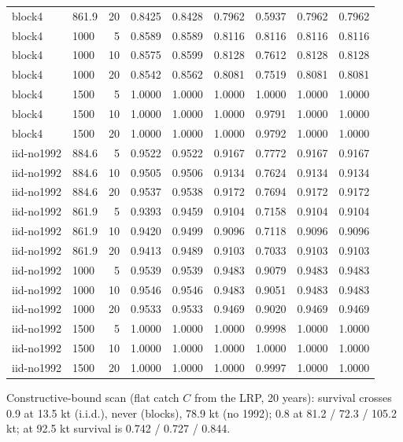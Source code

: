 \begin{longtable}{llrrrrrrr}
block4 & 861.9 & 20 & 0.8425 & 0.8428 & 0.7962 & 0.5937 & 0.7962 & 0.7962 \\
block4 & 1000 & 5 & 0.8589 & 0.8589 & 0.8116 & 0.8116 & 0.8116 & 0.8116 \\
block4 & 1000 & 10 & 0.8575 & 0.8599 & 0.8128 & 0.7612 & 0.8128 & 0.8128 \\
block4 & 1000 & 20 & 0.8542 & 0.8562 & 0.8081 & 0.7519 & 0.8081 & 0.8081 \\
block4 & 1500 & 5 & 1.0000 & 1.0000 & 1.0000 & 1.0000 & 1.0000 & 1.0000 \\
block4 & 1500 & 10 & 1.0000 & 1.0000 & 1.0000 & 0.9791 & 1.0000 & 1.0000 \\
block4 & 1500 & 20 & 1.0000 & 1.0000 & 1.0000 & 0.9792 & 1.0000 & 1.0000 \\
iid-no1992 & 884.6 & 5 & 0.9522 & 0.9522 & 0.9167 & 0.7772 & 0.9167 & 0.9167 \\
iid-no1992 & 884.6 & 10 & 0.9505 & 0.9506 & 0.9134 & 0.7624 & 0.9134 & 0.9134 \\
iid-no1992 & 884.6 & 20 & 0.9537 & 0.9538 & 0.9172 & 0.7694 & 0.9172 & 0.9172 \\
iid-no1992 & 861.9 & 5 & 0.9393 & 0.9459 & 0.9104 & 0.7158 & 0.9104 & 0.9104 \\
iid-no1992 & 861.9 & 10 & 0.9420 & 0.9499 & 0.9096 & 0.7118 & 0.9096 & 0.9096 \\
iid-no1992 & 861.9 & 20 & 0.9413 & 0.9489 & 0.9103 & 0.7033 & 0.9103 & 0.9103 \\
iid-no1992 & 1000 & 5 & 0.9539 & 0.9539 & 0.9483 & 0.9079 & 0.9483 & 0.9483 \\
iid-no1992 & 1000 & 10 & 0.9546 & 0.9546 & 0.9483 & 0.9051 & 0.9483 & 0.9483 \\
iid-no1992 & 1000 & 20 & 0.9533 & 0.9533 & 0.9469 & 0.9020 & 0.9469 & 0.9469 \\
iid-no1992 & 1500 & 5 & 1.0000 & 1.0000 & 1.0000 & 0.9998 & 1.0000 & 1.0000 \\
iid-no1992 & 1500 & 10 & 1.0000 & 1.0000 & 1.0000 & 1.0000 & 1.0000 & 1.0000 \\
iid-no1992 & 1500 & 20 & 1.0000 & 1.0000 & 1.0000 & 0.9997 & 1.0000 & 1.0000 \\
\end{longtable}
\par\noindent\begin{minipage}{0.97\linewidth}\footnotesize Constructive-bound scan (flat catch $C$ from the LRP, 20 years): survival crosses 0.9 at 13.5 kt (i.i.d.), never (blocks), 78.9 kt (no 1992); 0.8 at 81.2 / 72.3 / 105.2 kt; at 92.5 kt survival is 0.742 / 0.727 / 0.844.\end{minipage}
\endgroup
